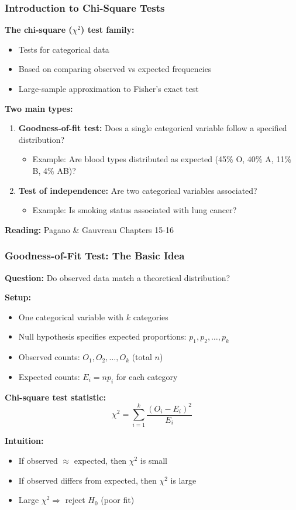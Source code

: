 \documentclass{beamer}
\begin{document}
\begin{frame}
\frametitle{Introduction to Chi-Square Tests}
\textbf{The chi-square ($\chi^2$) test family:}
\begin{itemize}
\item Tests for categorical data
\item Based on comparing observed vs expected frequencies
\item Large-sample approximation to Fisher's exact test
\end{itemize}

\vspace{0.5cm}
\textbf{Two main types:}
\begin{enumerate}
\item \textbf{Goodness-of-fit test:} Does a single categorical variable follow a specified distribution?
  \begin{itemize}
  \item Example: Are blood types distributed as expected (45\% O, 40\% A, 11\% B, 4\% AB)?
  \end{itemize}
\item \textbf{Test of independence:} Are two categorical variables associated?
  \begin{itemize}
  \item Example: Is smoking status associated with lung cancer?
  \end{itemize}
\end{enumerate}

\vspace{0.5cm}
\textbf{Reading:} Pagano \& Gauvreau Chapters 15-16
\end{frame}

\begin{frame}
\frametitle{Goodness-of-Fit Test: The Basic Idea}
\textbf{Question:} Do observed data match a theoretical distribution?

\vspace{0.3cm}
\textbf{Setup:}
\begin{itemize}\setlength\itemsep{-0.2em}
\item One categorical variable with $k$ categories
\item Null hypothesis specifies expected proportions: $p_1, p_2, \ldots, p_k$
\item Observed counts: $O_1, O_2, \ldots, O_k$ (total $n$)
\item Expected counts: $E_i = np_i$ for each category
\end{itemize}

\vspace{0.3cm}
\textbf{Chi-square test statistic:}
$$\chi^2 = \sum_{i=1}^{k} \frac{(O_i - E_i)^2}{E_i}$$

\vspace{0.2cm}
\textbf{Intuition:}
\begin{itemize}\setlength\itemsep{-0.2em}
\item If observed $\approx$ expected, then $\chi^2$ is small
\item If observed differs from expected, then $\chi^2$ is large
\item Large $\chi^2 \Rightarrow$ reject $H_0$ (poor fit)
\end{itemize}
\end{frame}
\end{document}
